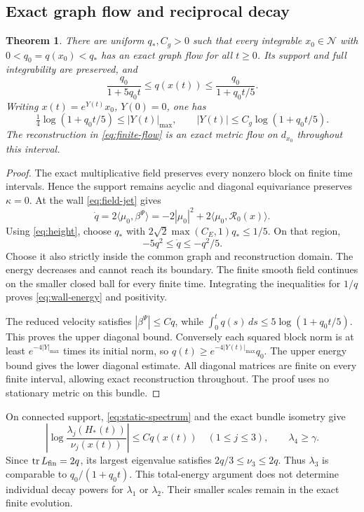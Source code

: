 \documentclass[11pt]{amsart}
\newtheorem{theorem}{Theorem}[section]
\theoremstyle{definition}
\theoremstyle{remark}
\newcommand{\tr}{\operatorname{tr}}
\begin{document}
\subsection{Exact graph flow and reciprocal decay}
\begin{theorem}\label{thm:wall-energy}
There are uniform $q_*,C_g>0$ such that every integrable
$x_0\in\mathcal N$ with $0<q_0=q(x_0)<q_*$ has an exact graph
flow for all $t\ge0$. Its support and full integrability are
preserved, and
\begin{equation}\label{eq:wall-energy}
 \frac{q_0}{1+5q_0t}\le q(x(t))
                  \le\frac{q_0}{1+q_0t/5}.
\end{equation}
Writing $x(t)=e^{Y(t)}x_0$, $Y(0)=0$, one has
\begin{equation}\label{eq:wall-diagonal}
 \tfrac14\log(1+q_0t/5)\le|Y(t)|_{\max},\qquad
 |Y(t)|\le C_g\log(1+q_0t/5).
\end{equation}
The reconstruction in \eqref{eq:finite-flow} is an exact metric
flow on $d_{x_0}$ throughout this interval.
\end{theorem}
\begin{proof}
The exact multiplicative field preserves every nonzero block
on finite time intervals. Hence the support remains acyclic
and diagonal equivariance preserves $\kappa=0$. At the wall
\eqref{eq:field-jet} gives
\[
 \dot q=2\langle\mu_0,\beta^\Psi\rangle
       =-2|\mu_0|^2+2\langle\mu_0,\mathcal R_0(x)\rangle .
\]
Using \eqref{eq:height}, choose $q_*$ with
$2\sqrt2\max(C_E,1)q_*\le1/5$. On that region,
\[
 -5q^2\le\dot q\le-q^2/5 .
\]
Choose it also strictly inside the common graph and reconstruction
domain. The energy decreases and cannot reach its boundary.
The finite smooth field continues on the smaller closed ball
for every finite time. Integrating the inequalities for $1/q$
proves \eqref{eq:wall-energy} and positivity.

The reduced velocity satisfies $|\beta^\Psi|\le Cq$, while
$\int_0^tq(s)\,ds\le5\log(1+q_0t/5)$. This proves the upper
diagonal bound. Conversely each squared block norm is at least
$e^{-4|Y|_{\max}}$ times its initial norm, so
$q(t)\ge e^{-4|Y(t)|_{\max}}q_0$. The upper energy bound gives
the lower diagonal estimate. All diagonal matrices are finite
on every finite interval, allowing exact reconstruction
throughout. The proof uses no stationary metric on this bundle.
\end{proof}

On connected support, \eqref{eq:static-spectrum} and the exact
bundle isometry give
\[
 \left|\log\frac{\lambda_j(H_*(t))}{\nu_j(x(t))}\right|
       \le Cq(x(t))\quad(1\le j\le3),\qquad \lambda_4\ge\gamma .
\]
Since $\tr L_{\rm fin}=2q$, its largest eigenvalue satisfies
$2q/3\le\nu_3\le2q$. Thus $\lambda_3$ is comparable to
$q_0/(1+q_0t)$. This total-energy argument does not determine
individual decay powers for $\lambda_1$ or $\lambda_2$.
Their smaller scales remain in the exact finite evolution.
\end{document}
